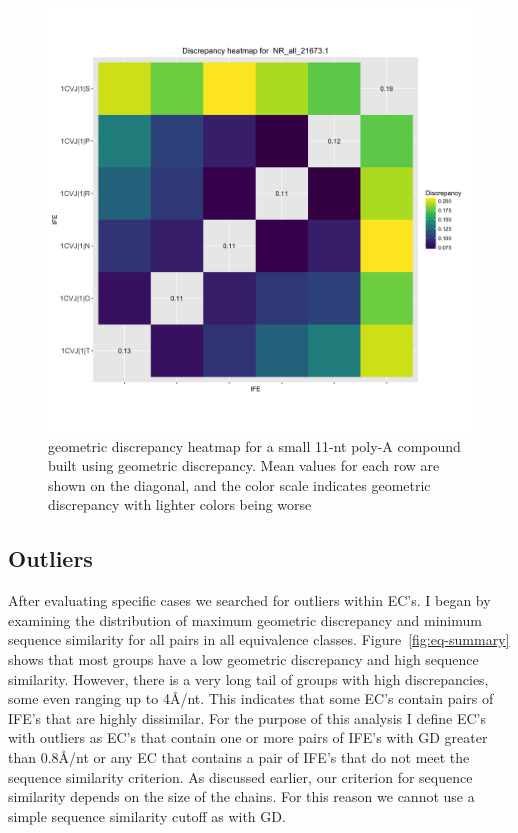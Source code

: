 \begin{figure}[h]
  \includegraphics[width=\textwidth]{chapter-3/figs/small-aa-disc}
  \caption{geometric discrepancy heatmap for a small 11-nt poly-A compound built using
    geometric discrepancy. Mean values for each row are shown on the diagonal, and the
  color scale indicates geometric discrepancy with lighter colors being worse}
  \label{fig:small-aa-disc}
\end{figure}

\subsection{Outliers}

After evaluating specific cases we searched for outliers within EC's. I began by
examining the distribution of maximum geometric discrepancy and minimum sequence
similarity for all pairs in all equivalence classes. Figure~\ref{fig:eq-summary}
shows that most groups have a low geometric discrepancy and high sequence
similarity. However, there is a very long tail of groups with high
discrepancies, some even ranging up to 4{\AA}/nt. This indicates that some EC's
contain pairs of IFE's that are highly dissimilar. For the purpose of this
analysis I define EC's with outliers as EC's that contain one or more pairs of
IFE's with GD greater than 0.8{\AA}/nt or any EC that contains a pair of IFE's
that do not meet the sequence similarity criterion. As discussed earlier, our
criterion for sequence similarity depends on the size of the chains. For this
reason we cannot use a simple sequence similarity cutoff as with GD.

